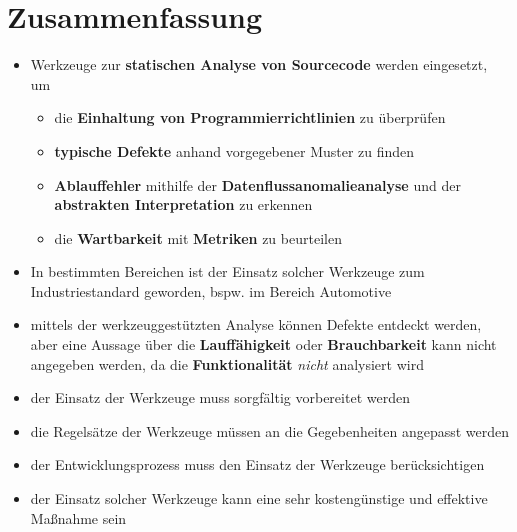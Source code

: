 \section{Zusammenfassung}

\begin{itemize}
    \item Werkzeuge zur \textbf{statischen Analyse von Sourcecode} werden eingesetzt, um
    \begin{itemize}
        \item die \textbf{Einhaltung von Programmierrichtlinien} zu überprüfen
        \item \textbf{typische Defekte} anhand vorgegebener Muster zu finden
        \item \textbf{Ablauffehler} mithilfe der \textbf{Datenflussanomalieanalyse} und der \textbf{abstrakten Interpretation} zu erkennen
        \item die \textbf{Wartbarkeit} mit \textbf{Metriken} zu beurteilen
    \end{itemize}
    \item In bestimmten Bereichen ist der Einsatz solcher Werkzeuge zum Industriestandard geworden, bspw. im Bereich Automotive
    \item mittels der werkzeuggestützten Analyse können Defekte entdeckt werden, aber eine Aussage über die \textbf{Lauffähigkeit} oder \textbf{Brauchbarkeit} kann nicht angegeben werden, da die \textbf{Funktionalität} \textit{nicht} analysiert wird
    \item der Einsatz der Werkzeuge muss sorgfältig vorbereitet werden
    \item die Regelsätze der Werkzeuge müssen an die Gegebenheiten angepasst werden
    \item der Entwicklungsprozess muss den Einsatz der Werkzeuge berücksichtigen
    \item der Einsatz solcher Werkzeuge kann eine sehr kostengünstige und effektive Maßnahme sein
\end{itemize}
